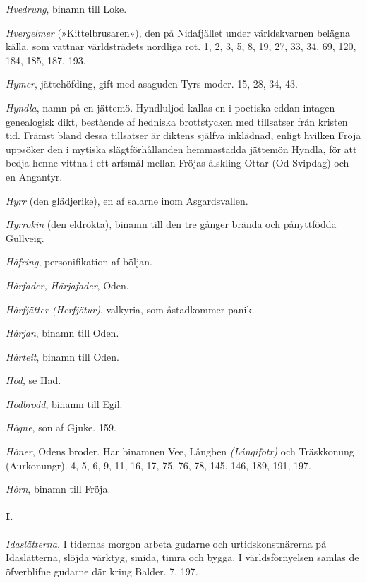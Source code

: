 \emph{Hvedrung}, binamn till Loke.

\emph{Hvergelmer} (»Kittelbrusaren»), den på Nidafjället under
världskvarnen belägna källa, som vattnar världsträdets nordliga rot. 1,
2, 3, 5, 8, 19, 27, 33, 34, 69, 120, 184, 185, 187, 193.

\emph{Hymer}, jättehöfding, gift med asaguden Tyrs moder. 15, 28, 34,
43.

\emph{Hyndla}, namn på en jättemö. Hyndluljod kallas en i poetiska eddan
intagen genealogisk dikt, bestående af hedniska brottstycken med
tillsatser från kristen tid. Främst bland dessa tillsatser är diktens
själfva inklädnad, enligt hvilken Fröja uppsöker den i mytiska
slägtförhållanden hemmastadda jättemön Hyndla, för att bedja henne
vittna i ett arfsmål mellan Fröjas älskling Ottar (Od-Svipdag) och en
Angantyr.

\emph{Hyrr} (den glädjerike), en af salarne inom Asgardsvallen.

\emph{Hyrrokin} (den eldrökta), binamn till den tre gånger brända och
pånyttfödda Gullveig.

\emph{Häfring}, personifikation af böljan.

\emph{Härfader, Härjafader}, Oden.

\emph{Härfjätter (Herfjötur)}, valkyria, som åstadkommer panik.

\emph{Härjan}, binamn till Oden.

\emph{Härteit}, binamn till Oden.

\emph{Höd}, se Had.

\emph{Hödbrodd}, binamn till Egil.

\protect\hypertarget{lb1625905.xhtmlux5cux23start225}{}{}\protect\hypertarget{lb1625905.xhtmlux5cux23start225-a}{}{}\protect\hypertarget{lb1625905.xhtmlux5cux23start225-b}{}{}\protect\hypertarget{lb1625905.xhtmlux5cux23start225-c}{}{}\protect\hypertarget{lb1625905.xhtmlux5cux23start225-d}{}{}

\emph{Högne}, son af Gjuke. 159.

\emph{Höner}, Odens broder. Har binamnen Vee, Långben \emph{(Lángifotr)}
och Träskkonung (Aurkonungr). 4, 5, 6, 9, 11, 16, 17, 75, 76, 78, 145,
146, 189, 191, 197.

\emph{Hörn}, binamn till Fröja.

\paragraph{I.}

\emph{Idaslätterna.} I tidernas morgon arbeta gudarne och
urtidskonstnärerna på Idaslätterna, slöjda värktyg, smida, timra och
bygga. I världsförnyelsen samlas de öfverblifne gudarne där kring
Balder. 7, 197.

